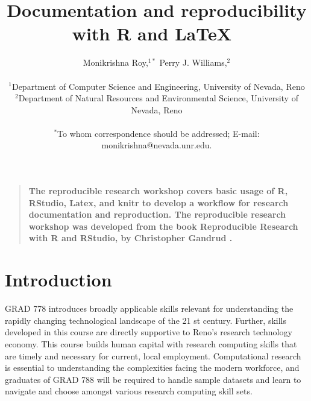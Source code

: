 \documentclass[12pt]{article}
\title{Documentation and reproducibility with R and \LaTeX\ }
\author
{Monikrishna Roy,$^{1\ast}$ Perry J. Williams,$^{2}$\\
\\
\normalsize{$^{1}$Department of Computer Science and Engineering, University of Nevada, Reno}\\
\normalsize{$^{2}$Department of Natural Resources and Environmental Science, University of Nevada, Reno}\\
\\
\normalsize{$^\ast$To whom correspondence should be addressed; E-mail:  monikrishna@nevada.unr.edu.}
}
\date{}
\newenvironment{sciabstract}{%
\begin{quote} \bf}
{\end{quote}}
\begin{document}

\baselineskip24pt


\maketitle




\begin{sciabstract}
      The reproducible research workshop covers basic usage of R, RStudio, Latex, and knitr to develop a workflow for research documentation and reproduction. The reproducible research workshop was developed from the book Reproducible Research with R and RStudio, by Christopher Gandrud \cite{glennie2021reproducible}.
\end{sciabstract}




\section*{Introduction}

GRAD 778 introduces broadly applicable skills relevant for understanding the rapidly changing technological landscape of the 21 st century. Further, skills developed in this course are directly supportive to Reno’s research technology economy. This course builds human capital with research computing skills that are timely and necessary for current, local employment. Computational research is essential to understanding the complexities facing the modern workforce, and graduates of GRAD 788 will be required to handle sample datasets and learn to navigate and choose amongst various research computing skill sets.
\end{document}
